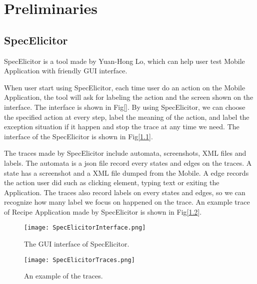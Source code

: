
\chapter{Preliminaries}\label{ch:preliminaries}


\section{SpecElicitor}

SpecElicitor is a tool made by Yuan-Hong Lo, 
which can help user test Mobile Application with friendly GUI interface.

When user start using SpecElicitor,
each time user do an action on the Mobile Application, 
the tool will ask for labeling the action and the screen shown on the interface.
The interface is shown in Fig[].
By using SpecElicitor, we can choose the specified action at every step, label the meaning of the action,
and label the exception situation if it happen and stop the trace at any time we need.
The interface of the SpecElicitor is shown in Fig[\ref{SpecElicitorInterface}].


The traces made by SpecElicitor include automata, screenshots, XML files and labels.
The automata is a json file record every states and edges on the traces.
A state has a screenshot and a XML file dumped from the Mobile.
A edge records the action user did such as clicking element, typing text or exiting the Application.
The traces also record labels on every states and edges,
so we can recognize how many label we focus on happened on the trace.
An example trace of Recipe Application made by SpecElicitor is shown in Fig[\ref{SpecElicitorTraces}].


\begin{figure}[h]
	\graphicspath{{pic/}}
	\begin{center}
		\texttt{[image: SpecElicitorInterface.png]}
		\caption{ The GUI interface of SpecElicitor.  }
		\label{SpecElicitorInterface}
	\end{center}
\end{figure}

\begin{figure}[h]
	\graphicspath{{pic/}}
	\begin{center}
		\texttt{[image: SpecElicitorTraces.png]}
		\caption{ An example of the traces.  }
		\label{SpecElicitorTraces}
	\end{center}
\end{figure}

